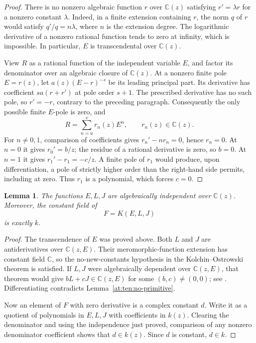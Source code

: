 \documentclass[11pt,a4paper]{article}
\newcommand{\C}{\mathbb C}
\newtheorem{lemma}[theorem]{Lemma}
\theoremstyle{definition}
\theoremstyle{remark}
\numberwithin{equation}{section}
\begin{document}
\begin{proof}
There is no nonzero algebraic function $r$ over $\C(z)$ satisfying
$r'=\lambda r$ for a nonzero constant $\lambda$.  Indeed, in a finite
extension containing $r$, the norm $q$ of $r$ would satisfy
$q'/q=n\lambda$, where $n$ is the extension degree.  The logarithmic
derivative of a nonzero rational function tends to zero at infinity,
which is impossible.  In particular, $E$ is transcendental over
$\C(z)$.

View $R$ as a rational function of the independent variable $E$, and
factor its denominator over an algebraic closure of $\C(z)$.  At a
nonzero finite pole $E=r(z)$, let
$a(z)(E-r)^{-s}$ be its leading principal part.  Its derivative has
coefficient $s a(r+r')$ at pole order $s+1$.  The prescribed derivative
has no such pole, so $r'=-r$, contrary to the preceding paragraph.
Consequently the only possible finite $E$-pole is zero, and
\[
 R=\sum_{n=u}^{v} r_n(z)E^n,\qquad r_n(z)\in\C(z).
\]
For $n\ne0,1$, comparison of coefficients gives
$r_n'-n r_n=0$, hence $r_n=0$.  At $n=0$ it gives $r_0'=b/z$;
the residue of a rational derivative is zero, so $b=0$.
At $n=1$ it gives $r_1'-r_1=-c/z$.  A finite pole of $r_1$ would
produce, upon differentiation, a pole of strictly higher order than
the right-hand side permits, including at zero.  Thus $r_1$ is a
polynomial, which forces $c=0$.
\end{proof}

\begin{lemma}\label{at:ten:independence}
The functions $E,L,J$ are algebraically independent over $\C(z)$.
Moreover, the constant field of
\[
 F=K(E,L,J)
\]
is exactly $k$.
\end{lemma}

\begin{proof}
The transcendence of $E$ was proved above.  Both $L$ and $J$ are
antiderivatives over $\C(z,E)$.  Their meromorphic-function extension
has constant field $\C$, so the no-new-constants hypothesis in the
Kolchin--Ostrowski theorem is satisfied.  If $L,J$ were algebraically
dependent over $\C(z,E)$, that theorem would give
$bL+cJ\in\C(z,E)$ for some $(b,c)\ne(0,0)$; see
\cite[Theorem~2.5]{at:Srinivasan2008}.  Differentiating contradicts
Lemma~\ref{at:ten:no-primitive}.

Now an element of $F$ with zero derivative is a complex constant $d$.
Write it as a quotient of polynomials in $E,L,J$ with coefficients in
$k(z)$.  Clearing the denominator and using the independence just
proved, comparison of any nonzero denominator coefficient shows that
$d\in k(z)$.  Since $d$ is constant, $d\in k$.
\end{proof}
\end{document}
